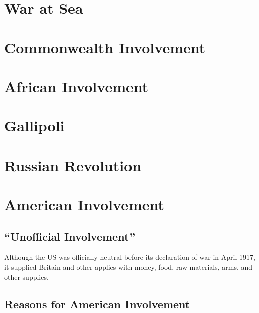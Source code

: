 \documentclass[a4paper,numbers=endperiod,most,twoside,english,final,openany]{scrbook} %
\begin{document}
\chapter{War at Sea}
\chapter{Commonwealth Involvement}
\chapter{African Involvement}
\chapter{Gallipoli}
\chapter{Russian Revolution}
\chapter{American Involvement}

\section{``Unofficial Involvement''}

Although the US was officially neutral before its declaration of war in April 1917, it supplied Britain and other applies with money, food, raw materials, arms, and other supplies. 

\section{Reasons for American Involvement}
\end{document}
